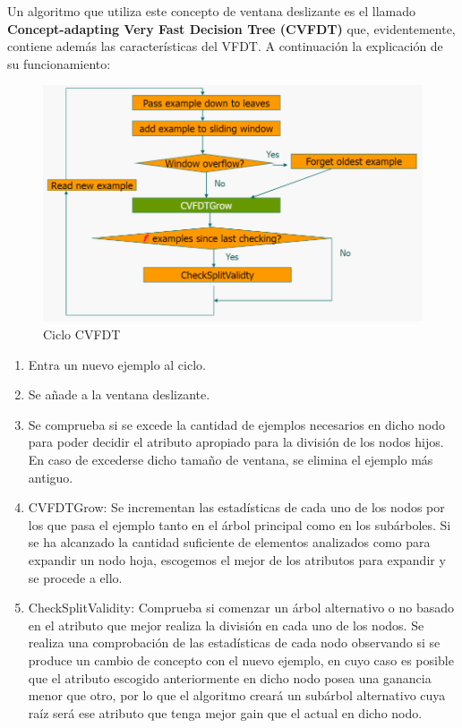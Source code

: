 Un algoritmo que utiliza este concepto de ventana deslizante es el llamado\textbf{ Concept-adapting Very Fast Decision Tree (CVFDT)} que, evidentemente, contiene además las características del VFDT. A continuación la explicación de su funcionamiento\cite{ref12}:

\begin{figure}[H]
	\centering
	\includegraphics[width=1\textwidth]{imagenes/cvfdt} 
	\caption{Ciclo CVFDT \cite{ref11}}
\end{figure}

\begin{enumerate}
	\item Entra un nuevo ejemplo al ciclo.
	\item Se añade a la ventana deslizante.
	\item Se comprueba si se excede la cantidad de ejemplos necesarios en dicho nodo para poder decidir el atributo apropiado para la división de los nodos hijos. En caso de excederse dicho tamaño de ventana, se elimina el ejemplo más antiguo.
	\item CVFDTGrow: Se incrementan las estadísticas de cada uno de los nodos por los que pasa el ejemplo tanto en el árbol principal como en los subárboles. Si se ha alcanzado la cantidad suficiente de elementos analizados como para expandir un nodo hoja, escogemos el mejor de los atributos para expandir y se procede a ello.
	\item CheckSplitValidity: Comprueba si comenzar un árbol alternativo o no basado en el atributo que mejor realiza la división en cada uno de los nodos. Se realiza una comprobación de las estadísticas de cada nodo observando si se produce un cambio de concepto con el nuevo ejemplo, en cuyo caso es posible que el atributo escogido anteriormente en dicho nodo posea una ganancia menor que otro, por lo que el algoritmo creará un subárbol alternativo cuya raíz será ese atributo que tenga mejor gain que el actual en dicho nodo.
\end{enumerate}

